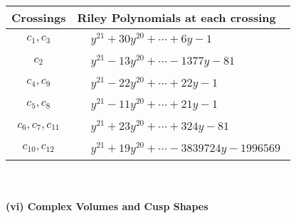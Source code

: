 \documentclass[1p]{elsarticle_modified}
\theoremstyle{definition}
\begin{document}
\begin{tabular}{m{50pt}|m{274pt}}
Crossings & \hspace{64pt}Riley Polynomials at each crossing \\
\hline $$\begin{aligned}c_{1},c_{3}\end{aligned}$$&$\begin{aligned}
&y^{21}+30 y^{20}+\cdots+6 y-1
\end{aligned}$\\
\hline $$\begin{aligned}c_{2}\end{aligned}$$&$\begin{aligned}
&y^{21}-13 y^{20}+\cdots-1377 y-81
\end{aligned}$\\
\hline $$\begin{aligned}c_{4},c_{9}\end{aligned}$$&$\begin{aligned}
&y^{21}-22 y^{20}+\cdots+22 y-1
\end{aligned}$\\
\hline $$\begin{aligned}c_{5},c_{8}\end{aligned}$$&$\begin{aligned}
&y^{21}-11 y^{20}+\cdots+21 y-1
\end{aligned}$\\
\hline $$\begin{aligned}c_{6},c_{7},c_{11}\end{aligned}$$&$\begin{aligned}
&y^{21}+23 y^{20}+\cdots+324 y-81
\end{aligned}$\\
\hline $$\begin{aligned}c_{10},c_{12}\end{aligned}$$&$\begin{aligned}
&y^{21}+19 y^{20}+\cdots-3839724 y-1996569
\end{aligned}$\\
\hline
\end{tabular}\\~\\
\newpage\flushleft \textbf{(vi) Complex Volumes and Cusp Shapes}
\end{document}
